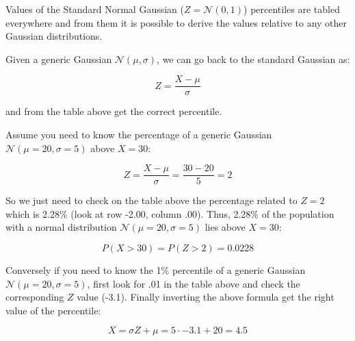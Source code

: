\label{transformation-to-standard-normal}

Values of the Standard Normal Gaussian (\(Z = \mathcal{N}(0,1)\))
percentiles are tabled everywhere and from them it is possible to
derive the values relative to any other Gaussian distributions.

Given a generic Gaussian \(\mathcal{N}(\mu , \sigma)\), we can go back
to the standard Gaussian as:

\[Z= \frac{X-\mu}{\sigma}\]

and from the table above get the correct percentile.

Assume you need to know the percentage of a generic Gaussian
\(\mathcal{N}(\mu=20 ,\sigma=5)\) above \(X=30\):

\[Z=\frac{X-\mu}{\sigma} = \frac{30-20}{5}=2\]

So we just need to check on the table above the percentage related to
\(Z=2\) which is 2.28\% (look at row -2.00, column .00). Thus, 2.28\% of
the population with a normal distribution
\(\mathcal{N}(\mu=20 ,\sigma=5)\) lies above \(X=30\):

\[P(X>30)=P(Z>2)=0.0228\]

Conversely if you need to know the 1\% percentile of a generic Gaussian
\(\mathcal{N}(\mu=20 ,\sigma=5)\), first look for .01 in the table above
and check the corresponding \(Z\) value (-3.1). Finally inverting the
above formula get the right value of the percentile:

\[ X= \sigma Z + \mu = 5\cdot -3.1 + 20 = 4.5 \]

